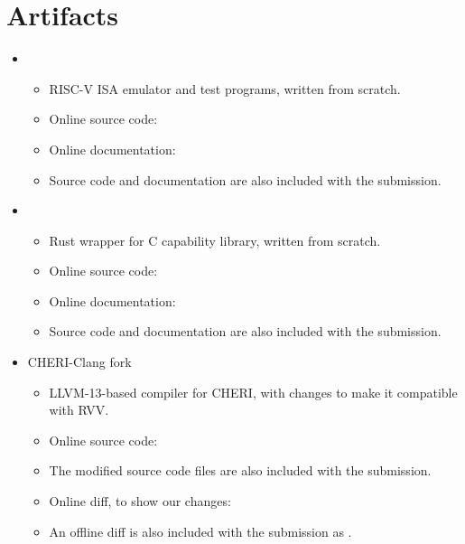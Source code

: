 \chapter{Artifacts}\label{appx:artifacts}

\begin{itemize}
    \item[] 
    \begin{itemize}
        \item[] RISC-V ISA emulator and test programs, written from scratch.
        \item[] Online source code: 
        \item[] Online documentation: 
        \item[] Source code and documentation are also included with the submission.
    \end{itemize}
    \item[] 
    \begin{itemize}
        \item[] Rust wrapper for C capability library, written from scratch.
        \item[] Online source code: 
        \item[] Online documentation: 
        \item[] Source code and documentation are also included with the submission.
    \end{itemize}
    \item[] CHERI-Clang fork
    \begin{itemize}
        \item[] LLVM-13-based compiler for CHERI, with changes to make it compatible with RVV.
        \item[] Online source code: 
        \item[] The modified source code files are also included with the submission.
        \item[] Online diff, to show our changes: 
        \item[] An offline diff is also included with the submission as .
    \end{itemize}
\end{itemize}
